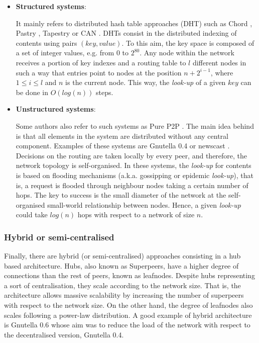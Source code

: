 \begin{itemize}
\item {\bf Structured systems}: 

    It mainly refers to distributed hash table approaches (DHT) such as Chord \cite{chord}, Pastry \cite{pastry}, Tapestry \cite{tapestry} or CAN \cite{can}. DHTs consist in the distributed indexing of contents using pairs $(key,value)$. To this aim, the key space is composed of a set of integer values, e.g. from 0 to $2^{80}$. Any node within the network receives a portion of key indexes and a routing table to $l$ different nodes in such a way that entries point to nodes at the position $n+2^{i-1}$, where $1 \le i \le l$ and $n$ is the current node. This way, the \emph{look-up} of a given $key$ can be done in $O(log(n))$ steps.


\item {\bf Unstructured systems}: 

    Some authors also refer to such systems as Pure P2P \cite{DBLP:conf/p2p/2005lncs}. The main idea behind is that all elements in the system are distributed without any central component. Examples of these systems are Gnutella 0.4 \cite{gnutella04} or newscast \cite{jelasity:newscast}. Decisions on the routing are taken locally by every peer, and therefore, the network topology is self-organised. In these systems, the \emph{look-up} for contents is based on flooding mechanisms (a.k.a. gossipping or epidemic \emph{look-up}), that is, a request is flooded through neighbour nodes taking a certain number of hops. The key to success is the small diameter of the network at the self-organised small-world relationship between nodes. Hence, a given \emph{look-up} could take $log(n)$ hops with respect to a network of size $n$.
\end{itemize}

\subsubsection{Hybrid or semi-centralised}

    Finally, there are hybrid (or semi-centralised) approaches consisting in a hub based architecture. Hubs, also known as Superpeers, have a higher degree of connections than the rest of peers, known as leafnodes. Despite hubs representing a sort of centralisation, they scale according to the network size. That is, the architecture allows massive scalability by increasing the number of superpeers with respect to the network size. On the other hand, the degree of leafnodes also scales following a power-law distribution. A good example of hybrid architecture is Gnutella 0.6 \cite{gnutella06} whose aim was to reduce the load of the network with respect to the decentralised version, Gnutella 0.4.


